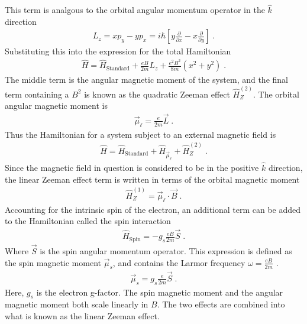         \noindent This term is analgous to the orbital angular momentum operator in the $\hat{k}$ direction 
        \begin{align}
            L_z = xp_y - yp_x = i\hbar \left[y \frac{\partial}{\partial x} - x \frac{\partial}{\partial y} \right]\;.
        \end{align}
        \noindent Substituting this into the expression for the total Hamiltonian
        \begin{align}
            \hat{H} =  \hat{H}_{\text{Standard}} + \frac{eB}{2m} L_z + \frac{e^2B^2}{8m} \left(x^2 + y^2\right)\;.
        \end{align}
        \noindent The middle term is the angular magnetic moment of the system, and the final term containing a $B^2$ is known as the quadratic Zeeman effect $\hat{H}_Z^{(2)}$. The orbital angular magnetic moment is \cite{Basdevant_Dalibard_2002}
        \begin{align}
            \vec{\mu}_\ell = \frac{e}{2m} \vec{L}\;.
        \end{align}
        \noindent Thus the Hamiltonian for a system subject to an external magnetic field is
        \begin{align}
            \hat{H} =  \hat{H}_{\text{Standard}} + \hat{H}_{\vec{\mu}_\ell} + \hat{H}_Z^{(2)} \;.
        \end{align}
        \noindent Since the magnetic field in question is considered to be in the positive $\hat{k}$ direction, the linear Zeeman effect term is written in terms of the orbital magnetic moment 
        \begin{align}
            \hat{H}_Z^{(1)} = \vec{\mu}_\ell \cdot \vec{B}\;.
        \end{align}
        \noindent Accounting for the intrinsic spin of the electron, an additional term can be added to the Hamiltonian called the spin interaction \cite{Sakurai_Napolitano_2020}
        \begin{align}
            \hat{H}_{\text{Spin}} = -g_s \frac{eB}{2m} \vec{S}\;.
        \end{align}
        \noindent Where $\vec{S}$ is the spin angular momentum operator. This expression is defined as the spin magnetic moment $\vec{\mu}_s$, and contains the Larmor frequency $\omega = \frac{eB}{2m}$ \cite{Foot_2005}.
        \begin{align}
            \vec{\mu}_s = g_s \frac{e}{2m} \vec{S}\;.
        \end{align}
        \noindent Here, $g_s$ is the electron g-factor. The spin magnetic moment and the angular magnetic moment both scale linearly in $B$. The two effects are combined into what is known as the linear Zeeman effect.
